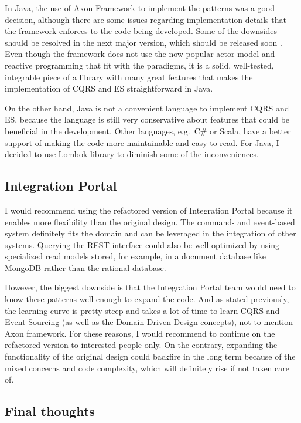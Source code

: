 \documentclass{book}
\begin{document}
In Java, the use of Axon Framework to implement the patterns was a good
decision, although there are some issues regarding implementation
details that the framework enforces to the code being developed. Some of
the downsides should be resolved in the next major version, which should
be released soon \cite{axon}. Even though the framework does not use the
now popular actor model and reactive programming that fit with the
paradigms, it is a solid, well-tested, integrable piece of a library
with many great features that makes the implementation of CQRS and ES
straightforward in Java.

On the other hand, Java is not a convenient language to implement CQRS
and ES, because the language is still very conservative about features
that could be beneficial in the development. Other languages, e.g.~C\#
or Scala, have a better support of making the code more maintainable and
easy to read. For Java, I decided to use Lombok library to diminish some
of the inconveniences.

\subsection{Integration Portal}\label{integration-portal}

I would recommend using the refactored version of Integration Portal
because it enables more flexibility than the original design. The
command- and event-based system definitely fits the domain and can be
leveraged in the integration of other systems. Querying the REST
interface could also be well optimized by using specialized read models
stored, for example, in a document database like MongoDB rather than the
rational database.

However, the biggest downside is that the Integration Portal team would
need to know these patterns well enough to expand the code. And as
stated previously, the learning curve is pretty steep and takes a lot of
time to learn CQRS and Event Sourcing (as well as the Domain-Driven
Design concepts), not to mention Axon framework. For these reasons, I
would recommend to continue on the refactored version to interested
people only. On the contrary, expanding the functionality of the
original design could backfire in the long term because of the mixed
concerns and code complexity, which will definitely rise if not taken
care of.

\subsection{Final thoughts}\label{final-thoughts}
\end{document}
